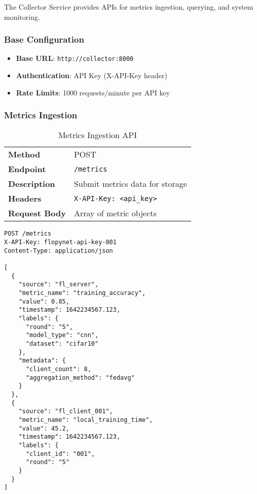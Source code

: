 The Collector Service provides APIs for metrics ingestion, querying, and system monitoring.

\subsubsection{Base Configuration}

\begin{itemize}
    \item \textbf{Base URL}: \texttt{http://collector:8000}
    \item \textbf{Authentication}: API Key (X-API-Key header)
    \item \textbf{Rate Limits}: 1000 requests/minute per API key
\end{itemize}

\subsubsection{Metrics Ingestion}

\begin{table}[H]
\centering
\caption{Metrics Ingestion API}
\label{tab:metrics-ingestion-api}
\begin{tabularx}{\textwidth}{@{}lX@{}}
\toprule
\textbf{Method} & POST \\
\textbf{Endpoint} & \texttt{/metrics} \\
\textbf{Description} & Submit metrics data for storage \\
\textbf{Headers} & \texttt{X-API-Key: <api\_key>} \\
\textbf{Request Body} & Array of metric objects \\
\bottomrule
\end{tabularx}
\end{table}

\begin{lstlisting}[style=jsoncode, caption=Metrics Ingestion Request]
POST /metrics
X-API-Key: flopynet-api-key-001
Content-Type: application/json

[
  {
    "source": "fl_server",
    "metric_name": "training_accuracy",
    "value": 0.85,
    "timestamp": 1642234567.123,
    "labels": {
      "round": "5",
      "model_type": "cnn",
      "dataset": "cifar10"
    },
    "metadata": {
      "client_count": 8,
      "aggregation_method": "fedavg"
    }
  },
  {
    "source": "fl_client_001",
    "metric_name": "local_training_time",
    "value": 45.2,
    "timestamp": 1642234567.123,
    "labels": {
      "client_id": "001",
      "round": "5"
    }
  }
]
\end{lstlisting}

